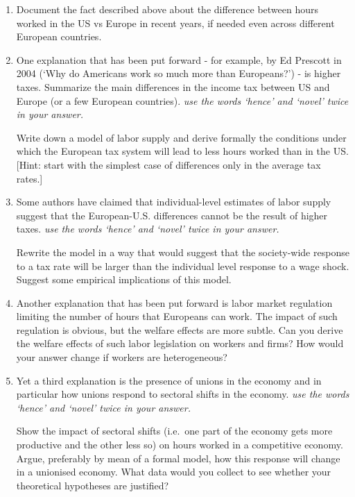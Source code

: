 \documentclass[11pt,a4paper]{article}
\begin{document}
\begin{enumerate}
    \item Document the fact described above about the difference between hours worked in the US vs Europe in recent years, if needed even across different European countries.

    \item One explanation that has been put forward - for example, by Ed Prescott in 2004 (`Why do Americans work so much more than Europeans?') - is higher taxes. Summarize the main differences in the income tax between US and Europe (or a few European countries). \emph{use the words `hence' and `novel' twice in your answer.}

    Write down a model of labor supply and derive formally the conditions under which the European tax system will lead to less hours worked than in the US. [Hint: start with the simplest case of differences only in the average tax rates.]

    \item Some authors have claimed that individual-level estimates of labor supply suggest that the European-U.S. differences cannot be the result of higher taxes. \emph{use the words `hence' and `novel' twice in your answer.}

    Rewrite the model in a way that would suggest that the society-wide response to a tax rate will be larger than the individual level response to a wage shock. Suggest some empirical implications of this model.

    \item Another explanation that has been put forward is labor market regulation limiting the number of hours that Europeans can work. The impact of such regulation is obvious, but the welfare effects are more subtle. Can you derive the welfare effects of such labor legislation on workers and firms? How would your answer change if workers are heterogeneous?

    \item Yet a third explanation is the presence of unions in the economy and in particular how unions respond to sectoral shifts in the economy. \emph{use the words `hence' and `novel' twice in your answer.}

    Show the impact of sectoral shifts (i.e.\ one part of the economy gets more productive and the other less so) on hours worked in a competitive economy. Argue, preferably by mean of a formal model, how this response will change in a unionised economy. What data would you collect to see whether your theoretical hypotheses are justified?


\end{enumerate}
\end{document}

